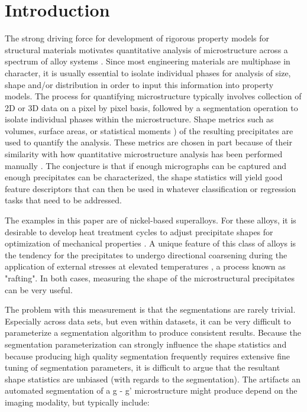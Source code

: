 \documentclass[review]{elsarticle}
\begin{document}
	\section{Introduction}
		The strong driving force for development of rigorous property models for structural materials motivates quantitative analysis of microstructure across a spectrum of alloy systems \cite{echlinlenthe}. Since most engineering materials are multiphase in character, it is usually essential to isolate individual phases for analysis of size, shape and/or distribution in order to input this information into property models. The process for quantifying microstructure typically involves collection of 2D or 3D data on a pixel by pixel basis, followed by a segmentation operation to isolate individual phases within the microstructure. Shape metrics such as volumes, surface areas, or statistical moments \cite{twoDM, threeDM}) of the resulting precipitates are used to quantify the analysis. These metrics are chosen in part because of their similarity with how quantitative microstructure analysis has been performed manually \cite{sluytman, underwood}. The conjecture is that if enough micrographs can be captured and enough precipitates can be characterized, the shape statistics will yield good feature descriptors that can then be used in whatever classification or regression tasks that need to be addressed.
		
		The examples in this paper are of nickel-based superalloys. For these alloys, it is desirable to develop heat treatment cycles to adjust precipitate shapes for optimization of mechanical properties \cite{sluytman}. A unique feature of this class of alloys is the tendency for the precipitates to undergo directional coarsening during the application of external stresses at elevated temperatures \cite{pollock2006}, a process known as "rafting". In both cases, measuring the shape of the microstructural precipitates can be very useful.

		The problem with this measurement is that the segmentations are rarely trivial. Especially across data sets, but even within datasets, it can be very difficult to parameterize a segmentation algorithm to produce consistent results. Because the segmentation parameterization can strongly influence the shape statistics and because producing high quality segmentation frequently requires extensive fine tuning of segmentation parameters, it is difficult to argue that the resultant shape statistics are unbiased (with regards to the segmentation). The artifacts an automated segmentation of a g - g' microstructure might produce depend on the imaging modality, but typically include:
\end{document}
